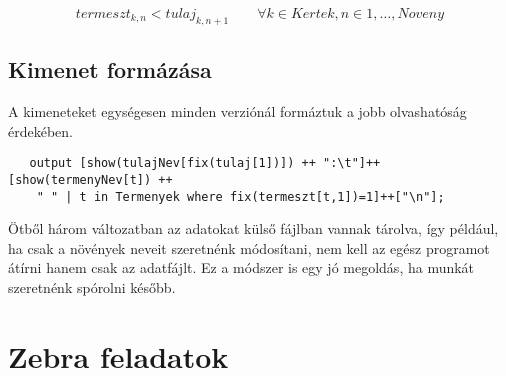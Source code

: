 \documentclass[12pt,a4paper,twoside, openright]{report}
\begin{document}
    \begin{equation}
    termeszt_{k,n} < tulaj_{k,n+1} \qquad \forall k \in Kertek, n \in 1,\dots,Noveny
	\end{equation}

\subsection{Kimenet formázása}

    A kimeneteket egységesen minden verziónál formáztuk a jobb olvashatóság érdekében.

   \begin{lstlisting}
   output [show(tulajNev[fix(tulaj[1])]) ++ ":\t"]++[show(termenyNev[t]) ++
    " " | t in Termenyek where fix(termeszt[t,1])=1]++["\n"];  \end{lstlisting}
   

    Ötből három változatban az adatokat külső fájlban vannak tárolva, így például, ha csak a növények neveit szeretnénk módosítani, nem kell az egész programot átírni hanem csak az adatfájlt.
    Ez a módszer is egy jó megoldás, ha munkát szeretnénk spórolni később.

\section{Zebra feladatok}
\end{document}
